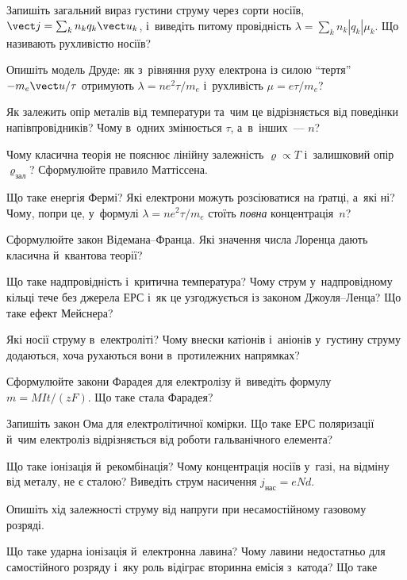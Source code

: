 \begin{Questions}
	\begin{quizlist}
		\item Запишіть загальний вираз густини струму через сорти носіїв, $\vect j=\sum_k
		  n_kq_k\vect u_k$, і~виведіть питому провідність $\lambda=\sum_k n_k|q_k|\mu_k$.
		  Що називають рухливістю носіїв?
		\item Опишіть модель Друде: як з~рівняння руху електрона із силою \enquote{тертя}
		  $-m_e\vect u/\tau$ отримують $\lambda=ne^2\tau/m_e$ і~рухливість
		  $\mu=e\tau/m_e$?
		\item Як залежить опір металів від температури та~чим це відрізняється від
		  поведінки напівпровідників? Чому в~одних змінюється $\tau$, а~в~інших~--- $n$?
		\item Чому класична теорія не пояснює лінійну залежність $\varrho\propto T$
		  і~залишковий опір $\varrho_{\text{зал}}$? Сформулюйте правило Маттіссена.
		\item Що таке енергія Фермі? Які електрони можуть розсіюватися на ґратці, а~які ні?
		  Чому, попри це, у~формулі $\lambda=ne^2\tau/m_e$ стоїть \emph{повна} концентрація~$n$?
		\item Сформулюйте закон Відемана--Франца. Які значення числа Лоренца дають класична
		  й~квантова теорії?
		\item Що таке надпровідність і~критична температура? Чому струм у~надпровідному
		  кільці тече без джерела ЕРС і~як це узгоджується із законом Джоуля--Ленца? Що таке
		  ефект Мейснера?
		\item Які носії струму в~електроліті? Чому внески катіонів і~аніонів у~густину
		  струму додаються, хоча рухаються вони в~протилежних напрямках?
		\item Сформулюйте закони Фарадея для електролізу й~виведіть формулу $m=M
		  It/(zF)$. Що таке стала Фарадея?
		\item Запишіть закон Ома для електролітичної комірки. Що таке ЕРС поляризації
		  й~чим електроліз відрізняється від роботи гальванічного елемента?
		\item Що таке іонізація й~рекомбінація? Чому концентрація носіїв у~газі, на
		  відміну від металу, не є сталою? Виведіть струм насичення $j_{\text{нас}}=eNd$.
		\item Опишіть хід залежності струму від напруги при несамостійному газовому
		  розряді.
		\item Що таке ударна іонізація й~електронна лавина? Чому лавини недостатньо для
		  самостійного розряду і~яку роль відіграє вторинна емісія з~катода? Що таке

\end{quizlist}
\end{Questions}
